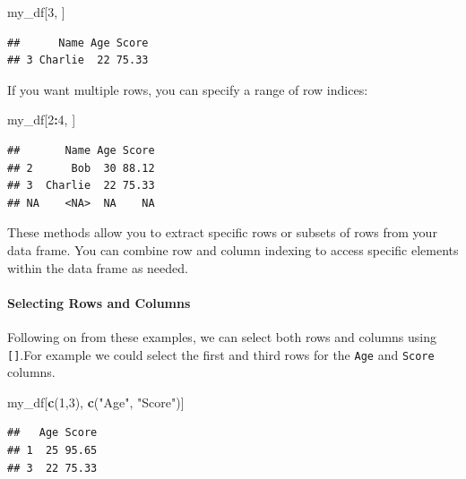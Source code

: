 \documentclass[
]{book}
\newenvironment{Shaded}{\begin{snugshade}}{\end{snugshade}}
\newcommand{\DecValTok}[1]{\textcolor[rgb]{0.00,0.00,0.81}{#1}}
\newcommand{\FunctionTok}[1]{\textcolor[rgb]{0.13,0.29,0.53}{\textbf{#1}}}
\newcommand{\NormalTok}[1]{#1}
\newcommand{\SpecialCharTok}[1]{\textcolor[rgb]{0.81,0.36,0.00}{\textbf{#1}}}
\newcommand{\StringTok}[1]{\textcolor[rgb]{0.31,0.60,0.02}{#1}}
\begin{document}
\begin{Shaded}
\begin{Highlighting}[]
\NormalTok{my\_df[}\DecValTok{3}\NormalTok{, ]}
\end{Highlighting}
\end{Shaded}

\begin{verbatim}
##      Name Age Score
## 3 Charlie  22 75.33
\end{verbatim}

If you want multiple rows, you can specify a range of row indices:

\begin{Shaded}
\begin{Highlighting}[]
\NormalTok{my\_df[}\DecValTok{2}\SpecialCharTok{:}\DecValTok{4}\NormalTok{, ]}
\end{Highlighting}
\end{Shaded}

\begin{verbatim}
##       Name Age Score
## 2      Bob  30 88.12
## 3  Charlie  22 75.33
## NA    <NA>  NA    NA
\end{verbatim}

These methods allow you to extract specific rows or subsets of rows from your data frame. You can combine row and column indexing to access specific elements within the data frame as needed.

\hypertarget{selecting-rows-and-columns}{%
\paragraph{Selecting Rows and Columns}\label{selecting-rows-and-columns}}

Following on from these examples, we can select both rows and columns using \texttt{{[}{]}}.For example we could select the first and third rows for the \texttt{Age} and \texttt{Score} columns.

\begin{Shaded}
\begin{Highlighting}[]
\NormalTok{my\_df[}\FunctionTok{c}\NormalTok{(}\DecValTok{1}\NormalTok{,}\DecValTok{3}\NormalTok{), }\FunctionTok{c}\NormalTok{(}\StringTok{"Age"}\NormalTok{, }\StringTok{"Score"}\NormalTok{)]}
\end{Highlighting}
\end{Shaded}

\begin{verbatim}
##   Age Score
## 1  25 95.65
## 3  22 75.33
\end{verbatim}
\end{document}
